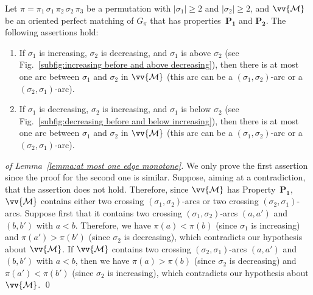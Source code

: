 \documentclass[a4paper]{llncs}
\begin{document}
\begin{lemma}
  \label{lemma:at most one edge monotone}
  Let $\pi = \pi_1 \, \sigma_1 \, \pi_2 \, \sigma_2 \, \pi_3$
  be a permutation with $|\sigma_1| \geq 2$ and $|\sigma_2| \geq 2$,
  and $\vv{\mathcal{M}}$ be an oriented perfect matching of $G_\pi$
  that has properties~$\mathbf{P_1}$ and $\mathbf{P_2}$.
  The following assertions hold:
  \begin{enumerate}
    \item
    If $\sigma_1$ is increasing, $\sigma_2$ is decreasing, and
    $\sigma_1$ is above $\sigma_2$
    (see Fig.~\ref{subfig:increasing before and above decreasing}),
    then there is at most one arc between $\sigma_1$ and
    $\sigma_2$ in $\vv{\mathcal{M}}$ (this arc can be a
    $(\sigma_1, \sigma_2)$-arc or a $(\sigma_2, \sigma_1)$-arc).
    \item
    If $\sigma_1$ is decreasing, $\sigma_2$ is increasing, and $\sigma_1$
    is below $\sigma_2$
    (see Fig.~\ref{subfig:decreasing before and below increasing}),
    then there is at most one arc between $\sigma_1$ and
    $\sigma_2$ in $\vv{\mathcal{M}}$ (this arc can be a
    $(\sigma_1, \sigma_2)$-arc or a $(\sigma_2, \sigma_1)$-arc).
  \end{enumerate}
\end{lemma}

\begin{proof}[of Lemma~\ref{lemma:at most one edge monotone}]
  We only prove the first assertion since the proof for the second one
  is similar.
  Suppose, aiming at a contradiction, that the assertion does not hold.
  Therefore, since $\vv{\mathcal{M}}$ has Property~$\mathbf{P_1}$,
  $\vv{\mathcal{M}}$ contains either two crossing $(\sigma_1, \sigma_2)$-arcs
  or two crossing $(\sigma_2, \sigma_1)$-arcs.
  Suppose first that it contains two crossing $(\sigma_1, \sigma_2)$-arcs
  $(a, a')$ and $(b, b')$ with $a < b$.
  Therefore, we have $\pi(a) < \pi(b)$ (since $\sigma_1$ is increasing)
  and $\pi(a') > \pi(b')$ (since
  $\sigma_2$ is decreasing), which contradicts our hypothesis about
  $\vv{\mathcal{M}}$.
  If $\vv{\mathcal{M}}$ contains two crossing $(\sigma_2, \sigma_1)$-arcs
  $(a, a')$ and $(b, b')$ with $a < b$, then
  we have $\pi(a) > \pi(b)$ (since $\sigma_2$ is decreasing)
  and $\pi(a') < \pi(b')$ (since
  $\sigma_2$ is increasing), which contradicts our hypothesis about
  $\vv{\mathcal{M}}$.
  \qed
\end{proof}
\end{document}
